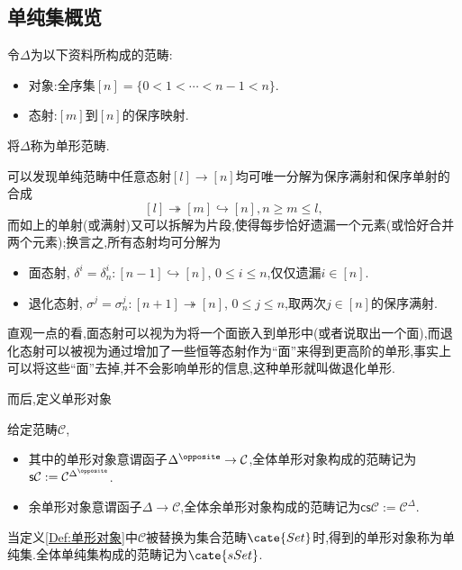 \subsection{单纯集概览}
\begin{definition}[单形范畴]
    令$\Delta$为以下资料所构成的范畴:
    \begin{itemize}
        \item 对象:全序集$[n]=\{0<1<\cdots<n-1<n\}$.
        \item 态射:$[m]$到$[n]$的保序映射.
    \end{itemize}
    将$\Delta$称为单形范畴.
\end{definition}
\begin{remark}\label{Rk:单纯范畴分解}
    可以发现单纯范畴中任意态射$[l]\to [n]$均可唯一分解为保序满射和保序单射的合成
    \[[l]\twoheadrightarrow [m]\hookrightarrow [n], n\geq m \leq l,\]
    而如上的单射(或满射)又可以拆解为片段,使得每步恰好遗漏一个元素(或恰好合并两个元素);换言之,所有态射均可分解为
    \begin{itemize}
        \item 面态射, $\delta^i=\delta_n^i:[n-1]\hookrightarrow [n]$, $0\leq i \leq n$,仅仅遗漏$i\in[n]$.
        \item 退化态射, $\sigma^j = \sigma_n^j: [n+1] \twoheadrightarrow [n]$, $0\leq j \leq n$,取两次$j\in[n]$的保序满射.
    \end{itemize}
    直观一点的看,面态射可以视为为将一个面嵌入到单形中(或者说取出一个面),而退化态射可以被视为通过增加了一些恒等态射作为``面''来得到更高阶的单形,事实上可以将这些``面''去掉,并不会影响单形的信息,这种单形就叫做退化单形.
\end{remark}
而后,定义单形对象
\begin{definition}[单形对象]\label{Def:单形对象}
    给定范畴$\mathcal{C}$,
    \begin{itemize}
        \item 其中的单形对象意谓函子$\Delta^{\opposite} \to \mathcal{C}$,全体单形对象构成的范畴记为$\mathsf{s}\mathcal{C}:= \mathcal{C}^{\Delta^{\opposite}}$.
        \item 余单形对象意谓函子$\Delta \to \mathcal{C}$,全体余单形对象构成的范畴记为$\mathsf{cs}\mathcal{C}:= \mathcal{C}^{\Delta}$.
    \end{itemize}
\end{definition}
\begin{definition}[单纯集]
    当定义\ref{Def:单形对象}中$\mathcal{C}$被替换为集合范畴$\cate{Set}$时,得到的单形对象称为单纯集.全体单纯集构成的范畴记为$\cate{sSet}$.
\end{definition}
